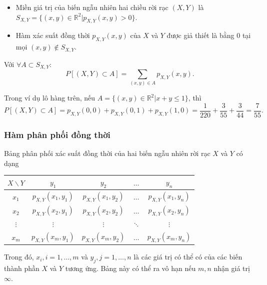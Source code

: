 \documentclass[12pt,a4paper]{article}
\begin{document}
\begin{luuy}
  \begin{itemize}
    \item Miền giá trị của biến ngẫu nhiên hai chiều rời rạc $(X, Y)$ là $S_{X,Y} = \{(x, y) \in \mathbb{R}^2 | p_{X,Y}(x, y) > 0\}$.
    \item Hàm xác suất đồng thời $p_{X,Y}(x, y)$ của $X$ và $Y$ được giả thiết là bằng 0 tại mọi $(x, y) \notin S_{X,Y}$.
  \end{itemize}
\end{luuy}

\begin{dinhly}[title={Định lý}]
  Với $\forall A \subset S_{X,Y}$:
  \[
    P[(X, Y) \subset A] = \displaystyle\sum_{(x,y) \in A} p_{X,Y}(x, y).
  \]
\end{dinhly}

\begin{vidu}[title={Tổng xác suất trên tập $A$}]
Trong ví dụ lô hàng trên, nếu $A = \{(x, y) \in \mathbb{R}^2 | x + y \le 1\}$, thì
  \[
    P[(X, Y ) \subset A] = p_{X,Y}(0, 0) + p_{X,Y}(0, 1) + p_{X,Y}(1, 0) = \dfrac{1}{220} + \dfrac{3}{55} + \dfrac{3}{44} = \dfrac{7}{55}.
  \]
\end{vidu}

\subsubsection{Hàm phân phối đồng thời}

\begin{dinhnghia}[title={Bảng phân phối xác suất đồng thời}]
  Bảng phân phối xác suất đồng thời của hai biến ngẫu nhiên rời rạc $X$ và $Y$ có dạng
  \begin{center}
    \begin{tabular}{c|cccc}
      $X \backslash Y$ & $y_1$ & $y_2$ & $\ldots$ & $y_n$ \\
      \hline
      $x_1$ & $p_{X,Y}(x_1, y_1)$ & $p_{X,Y}(x_1, y_2)$ & $\ldots$ & $p_{X,Y}(x_1, y_n)$ \\
      $x_2$ & $p_{X,Y}(x_2, y_1)$ & $p_{X,Y}(x_2, y_2)$ & $\ldots$ & $p_{X,Y}(x_2, y_n)$ \\
      $\vdots$ & $\vdots$ & $\vdots$ & $\ddots$ & $\vdots$ \\
      $x_m$ & $p_{X,Y}(x_m, y_1)$ & $p_{X,Y}(x_m, y_2)$ & $\ldots$ & $p_{X,Y}(x_m, y_n)$ \\
    \end{tabular}
  \end{center}
  Trong đó, $x_i, i = 1, \ldots, m$ và $y_j, j = 1, \ldots, n$ là các giá trị có thể có của các biến thành phần $X$ và $Y$ tương ứng. Bảng này có thể ra vô hạn nếu $m, n$ nhận giá trị $\infty$.
\end{dinhnghia}
\end{document}
